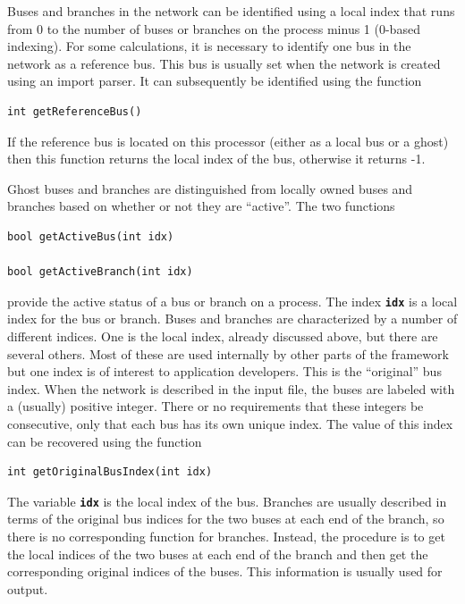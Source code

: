 \documentclass[12pt]{report} %
\begin{document}
Buses and branches in the network can be identified using a local index that runs from 0 to the number of buses or branches on the process minus 1 (0-based indexing). For some calculations, it is necessary to identify one bus in the network as a reference bus. This bus is usually set when the network is created using an import parser. It can subsequently be identified using the function

{
\color{red}
\begin{Verbatim}[fontseries=b]
int getReferenceBus()
\end{Verbatim}
}

If the reference bus is located on this processor (either as a local bus or a ghost) then this function returns the local index of the bus, otherwise it returns -1.

Ghost buses and branches are distinguished from locally owned buses and branches based on whether or not they are ``active''. The two functions

{
\color{red}
\begin{Verbatim}[fontseries=b]
bool getActiveBus(int idx)

bool getActiveBranch(int idx)
\end{Verbatim}
}

provide the active status of a bus or branch on a process. The index \texttt{\textbf{idx}} is a local index for the bus or branch.
Buses and branches are characterized by a number of different indices. One is the local index, already discussed above, but there are several others. Most of these are used internally by other parts of the framework but one index is of interest to application developers. This is the ``original'' bus index. When the network is described in the input file, the buses are labeled with a (usually) positive integer. There or no requirements that these integers be consecutive, only that each bus has its own unique index. The value of this index can be recovered using the function

{
\color{red}
\begin{Verbatim}[fontseries=b]
int getOriginalBusIndex(int idx)
\end{Verbatim}
}

The variable \texttt{\textbf{idx}} is the local index of the bus. Branches are usually described in terms of the original bus indices for the two buses at each end of the branch, so there is no corresponding function for branches. Instead, the procedure is to get the local indices of the two buses at each end of the branch and then get the corresponding original indices of the buses. This information is usually used for output.
\end{document}
